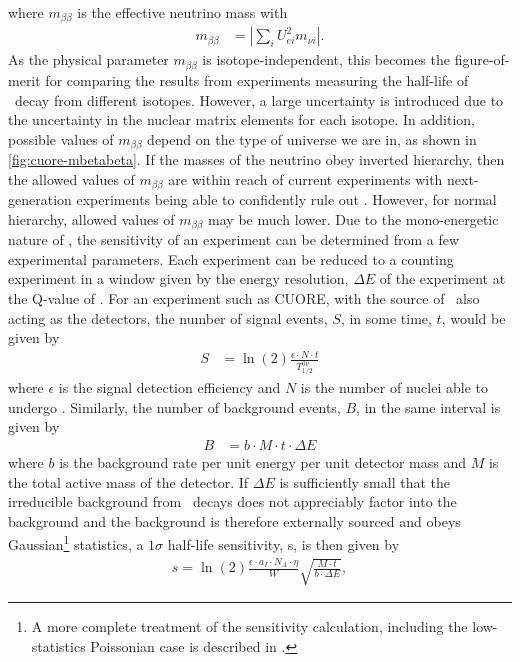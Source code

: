 where $m_{\beta\beta}$ is the effective neutrino mass with
\begin{align}
    m_{\beta\beta}&=|\sum_iU^2_{ei}m_{\nu i}|.
    \label{eq:mbetabeta}
\end{align}
As the physical parameter $m_{\beta\beta}$ is isotope-independent, this becomes the figure-of-merit for comparing the results from experiments measuring the half-life of \zeronubb~decay from different isotopes. However, a large uncertainty is introduced due to the uncertainty in the nuclear matrix elements for each isotope.
In addition, possible values of $m_{\beta\beta}$ depend on the type of universe we are in, as shown in \autoref{fig:cuore-mbetabeta}.
If the masses of the neutrino obey inverted hierarchy, then the allowed values of $m_{\beta\beta}$ are within reach of current experiments with next-generation experiments being able to confidently rule out \zeronubb. However, for normal hierarchy, allowed values of $m_{\beta\beta}$ may be much lower. 
Due to the mono-energetic nature of \zeronubb, the sensitivity of an experiment can be determined from a few experimental parameters.
Each experiment can be reduced to a counting experiment in a window given by the energy resolution, $\Delta E$ of the experiment at the Q-value of \zeronubb.
For an experiment such as CUORE, with the source of \zeronubb~also acting as the detectors, the number of signal events, $S$, in some time, $t$, would be given by
\begin{align}
    S &= \ln(2)\frac{\epsilon\cdot N \cdot t}{T^{0\nu}_{1/2}}
    \label{eq:signal_betabeta}
\end{align}
where $\epsilon$ is the signal detection efficiency and $N$ is the number of nuclei able to undergo \zeronubb.
Similarly, the number of background events, $B$, in the same interval is given by
\begin{align}
    B &= b\cdot M \cdot t \cdot \Delta E
    \label{eq:background_betabeta}
\end{align}
where $b$ is the background rate per unit energy per unit detector mass and $M$ is the total active mass of the detector.
If $\Delta E$ is sufficiently small that the irreducible background from \twonubb~decays does not appreciably factor into the background and the background is therefore externally sourced and obeys Gaussian\footnote{A more complete treatment of the sensitivity calculation, including the low-statistics Poissonian case is described in \cite{Alessandria:2011rc}.} statistics, a $1\sigma$ half-life sensitivity, s, is then given by
\begin{align}
    s=\ln(2)\frac{\epsilon \cdot a_I \cdot N_A \cdot \eta}{W} \sqrt{\frac{M\cdot t}{b\cdot \Delta E}},
    \label{eq:sensitivity_long}
\end{align}
